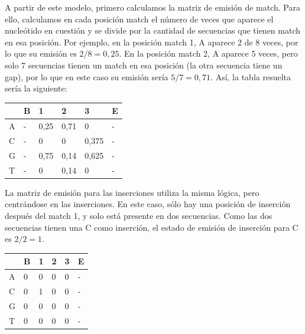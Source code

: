 A partir de este modelo, primero calculamos la matriz de emisión de match. Para ello, calculamos en cada posición match el número de veces que aparece el nucleótido en cuestión y se divide por la cantidad de secuencias que tienen match en esa posición. Por ejemplo, en la posición match 1, A aparece 2 de 8 veces, por lo que su emisión es $2/8 = 0,25$. En la posición match 2, A aparece 5 veces, pero solo 7 secuencias tienen un match en esa posición (la otra secuencia tiene un gap), por lo que en este caso su emisión sería $5/7 = 0,71$. Así, la tabla resuelta sería la siguiente:
\begin{table}[htbp]
\centering
\begin{tabular}{l | l l l l l}
& B & 1 & 2 & 3 & E \\ \hline
A & - & 0,25 & 0,71 & 0 & - \\
C & - & 0 & 0 & 0,375 & - \\
G & - & 0,75 & 0,14 & 0,625 & - \\
T & - & 0 & 0,14 & 0 & - 
\end{tabular}
\end{table}

La matriz de emisión para las inserciones utiliza la misma lógica, pero centrándose en las inserciones. En este caso, sólo hay una posición de inserción después del match 1, y solo está presente en dos secuencias. Como las dos secuencias tienen una C como inserción, el estado de emisión de inserción para C es $2/2 = 1$.
\begin{table}[htbp]
\centering
\begin{tabular}{l | l l l l l}
& B & 1 & 2 & 3 & E \\ \hline
A & 0 & 0 & 0 & 0 & - \\
C & 0& 1 & 0 & 0 & - \\
G & 0 & 0 & 0& 0 & - \\
T & 0& 0 & 0 & 0 & - 
\end{tabular}
\end{table}

